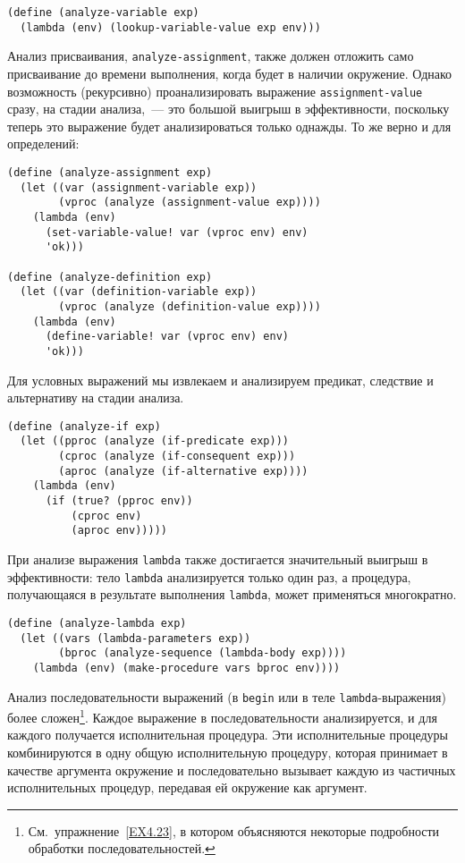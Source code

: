 \begin{Verbatim}[fontsize=\small]
(define (analyze-variable exp)
  (lambda (env) (lookup-variable-value exp env)))
\end{Verbatim}

Анализ присваивания, {\tt analyze-assignment}, также
должен отложить само присваивание до времени выполнения, когда будет в
наличии окружение.  Однако возможность (рекурсивно) проанализировать выражение
{\tt assignment-value} %
сразу, на стадии анализа,~--- это большой выигрыш в эффективности,
поскольку теперь это выражение будет анализироваться только однажды.
То же верно и для определений:

\begin{Verbatim}[fontsize=\small]
(define (analyze-assignment exp)
  (let ((var (assignment-variable exp))
        (vproc (analyze (assignment-value exp))))
    (lambda (env)
      (set-variable-value! var (vproc env) env)
      'ok)))

(define (analyze-definition exp)
  (let ((var (definition-variable exp))
        (vproc (analyze (definition-value exp))))
    (lambda (env)
      (define-variable! var (vproc env) env)
      'ok)))
\end{Verbatim}

Для условных выражений мы извлекаем и анализируем
предикат, следствие и альтернативу на стадии анализа.

\begin{Verbatim}[fontsize=\small]
(define (analyze-if exp)
  (let ((pproc (analyze (if-predicate exp)))
        (cproc (analyze (if-consequent exp)))
        (aproc (analyze (if-alternative exp))))
    (lambda (env)
      (if (true? (pproc env))
          (cproc env)
          (aproc env)))))
\end{Verbatim}

При анализе выражения {\tt lambda} также достигается
значительный выигрыш в эффективности: тело {\tt lambda}
анализируется только один раз, а процедура, получающаяся в результате
выполнения {\tt lambda}, может применяться многократно.

\begin{Verbatim}[fontsize=\small]
(define (analyze-lambda exp)
  (let ((vars (lambda-parameters exp))
        (bproc (analyze-sequence (lambda-body exp))))
    (lambda (env) (make-procedure vars bproc env))))
\end{Verbatim}

Анализ последовательности выражений (в {\tt begin}
или в теле {\tt lambda}-вы\-ра\-же\-ния) более 
сложен\footnote{См.~упражнение~\ref{EX4.23}, в котором
объясняются некоторые подробности обработки по\-сле\-до\-ва\-тель\-нос\-тей.}.
Каждое выражение в последовательности анализируется, и для каждого получается
исполнительная процедура. Эти исполнительные процедуры комбинируются в одну
общую исполнительную процедуру, которая принимает в качестве аргумента
окружение и последовательно вызывает каждую из частичных исполнительных
процедур, передавая ей окружение как аргумент.

